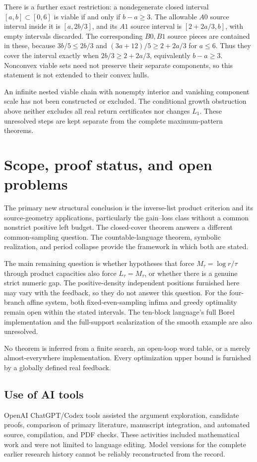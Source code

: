 \documentclass[11pt,reqno]{amsart}
\numberwithin{equation}{section}
\theoremstyle{definition}
\begin{document}
There is a further exact restriction: a nondegenerate closed interval
$[a,b]\subset[0,6]$ is viable if and only if $b-a\ge3$.
The allowable $A0$ source interval inside it is
$[a,2b/3]$, and its $A1$ source interval is
$[2+2a/3,b]$, with empty intervals discarded. The corresponding
$B0,B1$ source pieces are contained in these, because
$3b/5\le2b/3$ and $(3a+12)/5\ge2+2a/3$ for $a\le6$.
Thus they cover the interval exactly when
$2b/3\ge2+2a/3$, equivalently $b-a\ge3$.
Nonconvex viable sets need not preserve their separate components,
so this statement is not extended to their convex hulls.

An infinite nested viable chain with nonempty interior and vanishing
component scale has not been constructed or excluded. The conditional
growth obstruction above neither excludes all real return certificates
nor changes $L_1$. These unresolved steps are kept separate from
the complete maximum-pattern theorems.

\section{Scope, proof status, and open problems}\label{app:scope}
The primary new structural conclusion is the inverse-list product
criterion and its source-geometry applications, particularly the
gain--loss class without a common nonstrict positive left budget.
The closed-cover theorem answers a different common-sampling question.
The countable-language theorem, symbolic realization, and period
collapse provide the framework in which both are stated.

The main remaining question is whether hypotheses that force
$M_\tau=\log r/\tau$ through product capacities also force
$L_\tau=M_\tau$, or whether there is a genuine strict numeric gap.
The positive-density independent positions furnished here may vary
with the feedback, so they do not answer this question. For the
four-branch affine system, both fixed-even-sampling infima and greedy
optimality remain open within the stated intervals. The ten-block
language's full Borel implementation and the full-support scalarization
of the smooth example are also unresolved.

No theorem is inferred from a finite search, an open-loop word table,
or a merely almost-everywhere implementation. Every optimization
upper bound is furnished by a globally defined real feedback.

\subsection*{Use of AI tools}
OpenAI ChatGPT/Codex tools assisted the argument exploration,
candidate proofs, comparison of primary literature, manuscript
integration, and automated source, compilation, and PDF checks.
These activities included mathematical work and were not limited
to language editing. Model versions for the complete earlier
research history cannot be reliably reconstructed from the record.
\end{document}
